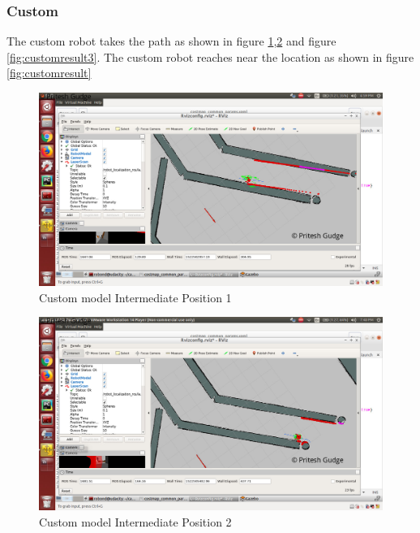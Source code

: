 \documentclass[10pt,journal,compsoc]{IEEEtran}
\begin{document}
\subsubsection{Custom}
The custom robot takes the path as shown in figure \ref{fig:customresult1},\ref{fig:customresult2} and figure \ref{fig:customresult3}.
The custom robot reaches near the location as shown in figure \ref{fig:customresult}

\begin{figure}[thpb]
      \centering
      \includegraphics[width=\linewidth]{images/custom1}
      \caption{Custom model Intermediate Position 1}
      \label{fig:customresult1}
\end{figure}


\begin{figure}[thpb]
      \centering
      \includegraphics[width=\linewidth]{images/custom3}
      \caption{Custom model Intermediate Position 2}
      \label{fig:customresult2}
\end{figure}
\end{document}
